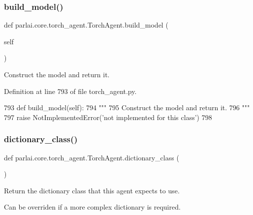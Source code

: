 \subsubsection{\texorpdfstring{build\+\_\+model()}{build\_model()}}
{\footnotesize\ttfamily def parlai.\+core.\+torch\+\_\+agent.\+Torch\+Agent.\+build\+\_\+model (\begin{DoxyParamCaption}\item[{}]{self }\end{DoxyParamCaption})}

\begin{DoxyVerb}Construct the model and return it.
\end{DoxyVerb}
 

Definition at line 793 of file torch\+\_\+agent.\+py.


\begin{DoxyCode}
793     \textcolor{keyword}{def }build\_model(self):
794         \textcolor{stringliteral}{"""}
795 \textcolor{stringliteral}{        Construct the model and return it.}
796 \textcolor{stringliteral}{        """}
797         \textcolor{keywordflow}{raise} NotImplementedError(\textcolor{stringliteral}{'not implemented for this class'})
798 
\end{DoxyCode}
\mbox{\label{classparlai_1_1core_1_1torch__agent_1_1TorchAgent_aea8849fa69a3f5dbd3216c8b06f180ea}} 
\subsubsection{\texorpdfstring{dictionary\+\_\+class()}{dictionary\_class()}}
{\footnotesize\ttfamily def parlai.\+core.\+torch\+\_\+agent.\+Torch\+Agent.\+dictionary\+\_\+class (\begin{DoxyParamCaption}{ }\end{DoxyParamCaption})\hspace{0.3cm}{\ttfamily [static]}}

\begin{DoxyVerb}Return the dictionary class that this agent expects to use.

Can be overriden if a more complex dictionary is required.
\end{DoxyVerb}
 

